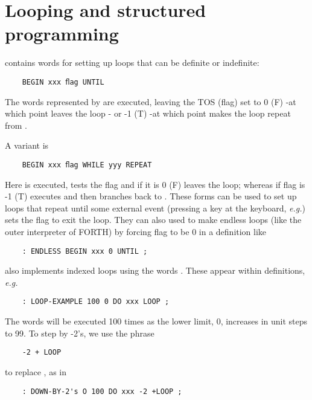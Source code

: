 \section{Looping and structured programming}

 contains words for setting up loops that can be definite or indefinite:

\begin{lstlisting}
    BEGIN xxx ﬂag UNTIL
\end{lstlisting}

The words represented by  are executed, leaving the TOS (ﬂag) set to 0 (F) -at which point  leaves the loop - or -1 (T) -at which point  makes the loop repeat from .

A variant is
\begin{lstlisting}
    BEGIN xxx ﬂag WHILE yyy REPEAT
\end{lstlisting}

Here  is executed,  tests the ﬂag and if it is 0 (F) leaves the loop; whereas if flag is -1 (T)  executes  and  then branches back to . These forms can be used to set up loops that repeat until some external event (pressing a key at the keyboard, \textit{e.g.}) sets the ﬂag to exit the loop. They can also used to make endless loops (like the outer interpreter of FORTH) by forcing flag to be 0 in a definition like

\begin{lstlisting}
    : ENDLESS BEGIN xxx 0 UNTIL ;
\end{lstlisting}

 also implements indexed loops using the words . These appear within definitions, \textit{e.g.}

\begin{lstlisting}
    : LOOP-EXAMPLE 100 0 DO xxx LOOP ;
\end{lstlisting}

The words  will be executed 100 times as the lower limit, 0, increases in unit steps to 99. To step by -2's, we use the phrase

\begin{lstlisting}
    -2 + LOOP
\end{lstlisting}

to replace , as in

\begin{lstlisting}
    : DOWN-BY-2's O 100 DO xxx -2 +LOOP ;
\end{lstlisting}

